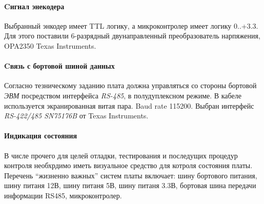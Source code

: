 \documentclass{article}
\begin{document}


\paragraph{Cигнал энекодера}
Выбранный энкодер имеет TTL логику, а микроконтролер имеет логику 0..+3.3.
Для этого поставили 6-разрядный двунаправленный преобразователь нарпяжения, OPA2350 Texas Instruments.

\paragraph{Cвязь с бортовой шиной данных}
Согласно тезническому заданию плата должна управляться со стороны бортовой \textit{ЭВМ} посредством
интерфейса \textit{RS-485}, в полудуплексном режиме. В кабеле используется экранированная витая пара.
Baud rate 115200. Выбран интерфейс \textit{RS-422/485 SN75176B} от Texas Instruments.

%

\paragraph{Индикация состояния}
В числе прочего для целей отладки, тестирования и последущих процедур контроля
необхрдимо иметь визуальное средство для котроля состояния платы.
Перечень ``жизненно важных'' систем платы включает:
шину бортового питания,
шину питаня 12В,
шину питаня 5В,
шину питаня 3.3В,
бортовая шина передачи информации RS485,
микроконтролер.
\end{document}
